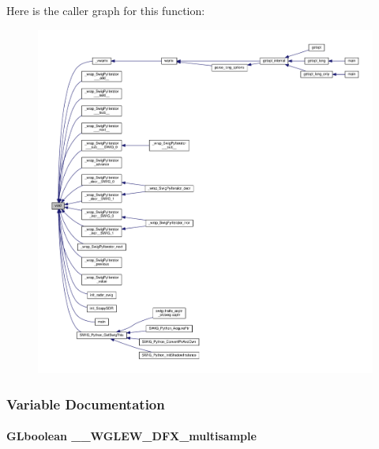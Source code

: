 Here is the caller graph for this function\+:
\nopagebreak
\begin{figure}[H]
\begin{center}
\leavevmode
\includegraphics[width=350pt]{db/d82/wglew_8h_aeea6e3dfae3acf232096f57d2d57f084_icgraph}
\end{center}
\end{figure}




\subsubsection{Variable Documentation}
\paragraph[{\+\_\+\+\_\+\+W\+G\+L\+E\+W\+\_\+3\+D\+F\+X\+\_\+multisample}]{ {\bf G\+Lboolean} \+\_\+\+\_\+\+W\+G\+L\+E\+W\+\_\+D\+F\+X\+\_\+multisample}\label{wglew_8h_a2a220af211963474cda4ed6e6d76cf56}


